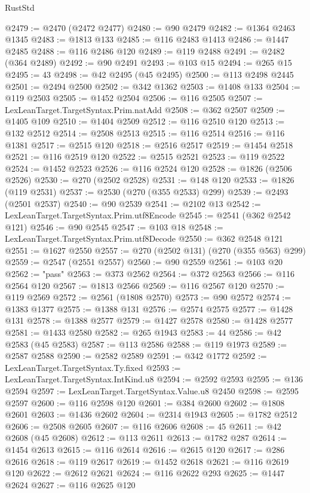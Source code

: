 \begin{lexlean}{RustStd}
\begin{coremodule}
@2479 := @2470 (@2472 @2477)
@2480 := @90 @2479
@2482 := @1364 @2463 @1345
@2483 := @1813 @133
@2485 := @116 @2483 @1413
@2486 := @1447 @2485
@2488 := @116 @2486 @120
@2489 := @119 @2488
@2491 := @2482 (@364 @2489)
@2492 := @90 @2491
@2493 := @103 @15
@2494 := @265 @15
@2495 := 43
@2498 := @42 @2495 (@45 @2495)
@2500 := @113 @2498 @2445
@2501 := @2494 @2500
@2502 := @342 @1362
@2503 := @1408 @133
@2504 := @119 @2503
@2505 := @1452 @2504
@2506 := @116 @2505
@2507 := LexLeanTarget.TargetSyntax.Prim.natAdd
@2508 := @362 @2507
@2509 := @1405 @109
@2510 := @1404 @2509
@2512 := @116 @2510 @120
@2513 := @132 @2512
@2514 := @2508 @2513
@2515 := @116 @2514
@2516 := @116 @1381
@2517 := @2515 @120
@2518 := @2516 @2517
@2519 := @1454 @2518
@2521 := @116 @2519 @120
@2522 := @2515 @2521
@2523 := @119 @2522
@2524 := @1452 @2523
@2526 := @116 @2524 @120
@2528 := @1826 (@2506 @2526)
@2530 := @270 (@2502 @2528)
@2531 := @148 @120
@2533 := @1826 (@119 @2531)
@2537 := @2530 (@270 (@355 @2533) @299)
@2539 := @2493 (@2501 @2537)
@2540 := @90 @2539
@2541 := @2102 @13
@2542 := LexLeanTarget.TargetSyntax.Prim.utf8Encode
@2545 := @2541 (@362 @2542 @121)
@2546 := @90 @2545
@2547 := @103 @18
@2548 := LexLeanTarget.TargetSyntax.Prim.utf8Decode
@2550 := @362 @2548 @121
@2551 := @1627 @2550
@2557 := @270 (@2502 @131) (@270 (@355 @563) @299)
@2559 := @2547 (@2551 @2557)
@2560 := @90 @2559
@2561 := @103 @20
@2562 := "pass"
@2563 := @373 @2562
@2564 := @372 @2563
@2566 := @116 @2564 @120
@2567 := @1813 @2566
@2569 := @116 @2567 @120
@2570 := @119 @2569
@2572 := @2561 (@1808 @2570)
@2573 := @90 @2572
@2574 := @1383 @1377
@2575 := @1388 @131
@2576 := @2574 @2575
@2577 := @1428 @131
@2578 := @1388 @2577
@2579 := @1427 @2578
@2580 := @1428 @2577
@2581 := @1433 @2580
@2582 := @265 @1943
@2583 := 44
@2586 := @42 @2583 (@45 @2583)
@2587 := @113 @2586
@2588 := @119 @1973
@2589 := @2587 @2588
@2590 := @2582 @2589
@2591 := @342 @1772
@2592 := LexLeanTarget.TargetSyntax.Ty.fixed
@2593 := LexLeanTarget.TargetSyntax.IntKind.u8
@2594 := @2592 @2593
@2595 := @136 @2594
@2597 := LexLeanTarget.TargetSyntax.Value.u8 @2450
@2598 := @2595 @2597
@2600 := @116 @2598 @120
@2601 := @384 @2600
@2602 := @1808 @2601
@2603 := @1436 @2602
@2604 := @2314 @1943
@2605 := @1782 @2512
@2606 := @2508 @2605
@2607 := @116 @2606
@2608 := 45
@2611 := @42 @2608 (@45 @2608)
@2612 := @113 @2611
@2613 := @1782 @287
@2614 := @1454 @2613
@2615 := @116 @2614
@2616 := @2615 @120
@2617 := @286 @2616
@2618 := @119 @2617
@2619 := @1452 @2618
@2621 := @116 @2619 @120
@2622 := @2612 @2621
@2624 := @116 @2622 @293
@2625 := @1447 @2624
@2627 := @116 @2625 @120

\end{coremodule}
\end{lexlean}
